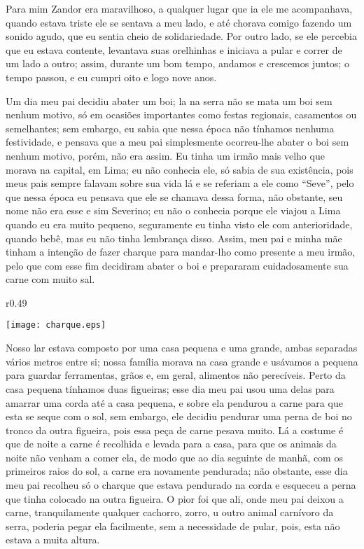 Para mim Zandor era maravilhoso, a qualquer lugar que ia ele me acompanhava, quando estava triste ele se sentava a meu lado, e até chorava comigo fazendo um sonido agudo, que eu sentia cheio de solidariedade. 
Por outro lado, se ele percebia que eu estava contente, levantava suas orelhinhas e iniciava a pular e correr de um lado a outro; assim, durante um bom tempo, andamos e crescemos juntos; o tempo passou, e eu cumpri oito e logo nove anos.

Um dia meu pai decidiu abater um boi; la na serra não se mata um boi sem nenhum motivo, só em ocasiões importantes como festas regionais, casamentos ou semelhantes; sem embargo, eu sabia que nessa época não tínhamos nenhuma festividade, e pensava que a meu pai simplesmente ocorreu-lhe abater o boi sem nenhum motivo, porém, não era assim. 
Eu tinha um irmão mais velho que morava na capital, em Lima; eu não conhecia ele, só sabia de sua existência, pois meus pais sempre falavam sobre sua vida lá e se referiam a ele como ``Seve'', pelo que nessa época eu pensava que ele se chamava dessa forma, não obstante, seu nome não era esse e sim Severino; eu não o conhecia porque ele viajou a Lima quando eu era muito pequeno, seguramente eu tinha visto ele com anterioridade, quando bebê, mas eu não tinha lembrança disso. 
Assim, meu pai e minha mãe tinham a intenção de fazer charque para mandar-lho como presente a meu irmão, pelo que com esse fim decidiram abater o boi e prepararam cuidadosamente sua carne com muito sal.

\begin{wrapfigure}{r}{0.49\textwidth}
  \begin{center}
  \vspace{-20pt}
    \texttt{[image: charque.eps]}
  \end{center}
  \vspace{-20pt}
\end{wrapfigure}
Nosso lar estava composto por uma casa pequena e uma grande, ambas separadas vários metros entre si; nossa família morava na casa grande e usávamos a pequena para guardar ferramentas, grãos e, em geral, alimentos não perecíveis. Perto da casa pequena tínhamos duas figueiras; esse dia meu pai usou uma delas para amarrar uma corda até a casa pequena, e sobre ela pendurou a carne para que esta se seque com o sol, sem embargo, ele decidiu pendurar uma perna de boi no tronco da outra figueira, pois essa peça de carne pesava muito.
Lá a costume é que de noite a carne é recolhida e levada para a casa, para que os animais da noite não venham a comer ela, de modo que ao dia seguinte de manhã, com os primeiros raios do sol, a carne era novamente pendurada; não obstante, esse dia meu pai recolheu só o charque que estava pendurado na corda e esqueceu a perna que tinha colocado na outra figueira. 
O pior foi que ali, onde meu pai deixou a carne, tranquilamente qualquer cachorro, zorro, u outro animal carnívoro da serra, poderia pegar ela facilmente, sem a necessidade de pular, pois, esta não estava a muita altura.

